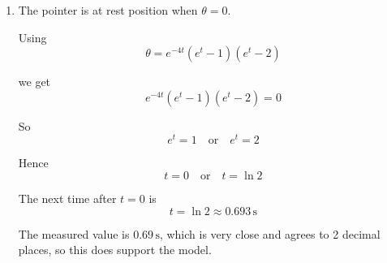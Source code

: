 \documentclass[leqno]{article}
\begin{document}
\begin{enumerate}[
  label=\textbf{\arabic*.},
  leftmargin=*,
  topsep=0pt,
  partopsep=0pt,
  parsep=0pt
]
\begin{djsSolution}
\begin{enumerate}[label=\textbf{(\alph*)}]
Factor \(\theta\):
\begin{align*}
\theta
&=e^{-4t}\bigl(e^{2t}-3e^t+2\bigr)\\
&=e^{-4t}(e^t-1)(e^t-2)
\end{align*}

For \(0<t<\ln 2\):
\[
e^t-1>0
\quad\text{and}\quad
e^t-2<0
\]

so \(\theta<0\), which is an anticlockwise displacement.

For \(t>\ln 2\):
\[
e^t-1>0
\quad\text{and}\quad
e^t-2>0
\]

so \(\theta>0\), which is a clockwise displacement.

Therefore the greatest clockwise displacement occurs at the later stationary point
\[
t=\ln\left(\frac{9+\sqrt{17}}{4}\right)\approx 1.188
\]

Substituting into \(\theta\):
\[
\theta_{\max}=e^{-2t}-3e^{-3t}+2e^{-4t}\approx 0.0252
\]

Hence the greatest clockwise angular displacement is
\[
0.025\,\mathrm{rad}\qquad\text{(3 d.p.)}
\]

\item The pointer is at rest position when \(\theta=0\).

Using
\[
\theta=e^{-4t}(e^t-1)(e^t-2)
\]

we get
\[
e^{-4t}(e^t-1)(e^t-2)=0
\]

So
\[
e^t=1 \quad\text{or}\quad e^t=2
\]

Hence
\[
t=0 \quad\text{or}\quad t=\ln 2
\]

The next time after \(t=0\) is
\[
t=\ln 2\approx 0.693\,\mathrm{s}
\]

The measured value is \(0.69\,\mathrm{s}\), which is very close and agrees to 2 decimal places, so this does support the model.
\end{enumerate}
\end{djsSolution}


\newpage

\questionitem


\end{enumerate}
\end{document}
